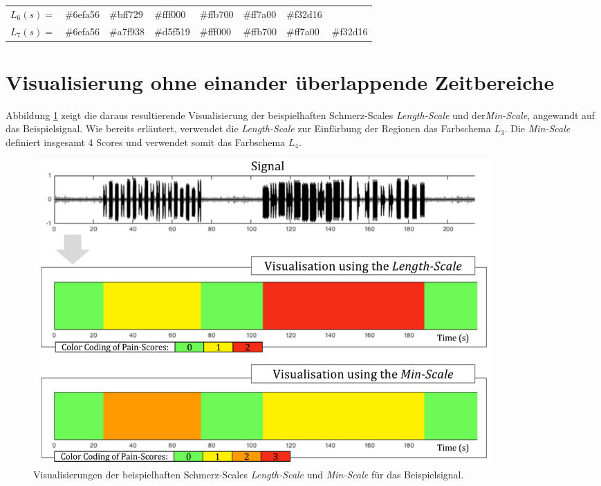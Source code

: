 \begin{table}[h]
\begin{tabular}{@{}clllllll@{}}
\multicolumn{1}{l|}{$L_6(s) = $} & \multicolumn{1}{l|}{\cellcolor[HTML]{6EFA56}\#6efa56} & \multicolumn{1}{l|}{\cellcolor[HTML]{BFF729}\#bff729} & \multicolumn{1}{l|}{\cellcolor[HTML]{FFF000}\#fff000} & \multicolumn{1}{l|}{\cellcolor[HTML]{FFB700}\#ffb700} & \multicolumn{1}{l|}{\cellcolor[HTML]{FF7A00}\#ff7a00} & \multicolumn{1}{l|}{\cellcolor[HTML]{F32D16}\#f32d16} &                                                       \\ \cmidrule(l){2-8} 
\multicolumn{1}{l|}{$L_7(s) = $} & \multicolumn{1}{l|}{\cellcolor[HTML]{6EFA56}\#6efa56} & \multicolumn{1}{l|}{\cellcolor[HTML]{A7F938}\#a7f938} & \multicolumn{1}{l|}{\cellcolor[HTML]{D5F519}\#d5f519} & \multicolumn{1}{l|}{\cellcolor[HTML]{FFF000}\#fff000} & \multicolumn{1}{l|}{\cellcolor[HTML]{FFB700}\#ffb700} & \multicolumn{1}{l|}{\cellcolor[HTML]{FF7A00}\#ff7a00} & \multicolumn{1}{l|}{\cellcolor[HTML]{F32D16}\#f32d16} \\ \bottomrule
\end{tabular}
\end{table}

\section{Visualisierung ohne einander überlappende Zeitbereiche}
\label{sec:vizNoOverlap}

Abbildung \ref{fig:viz_without_t_01} zeigt die daraus resultierende Visualisierung der beispielhaften Schmerz-Scales \emph{Length-Scale} und der\emph{Min-Scale}, angewandt auf das Beispielsignal. Wie bereits erläutert, verwendet die \emph{Length-Scale} zur Einfärbung der Regionen das Farbschema $L_3$. Die \emph{Min-Scale} definiert insgesamt 4 Scores und verwendet somit das Farbschema $L_4$.

\begin{figure}[h]
	\centering
	\includegraphics[width=0.85\textwidth]{bilder/viz_without_t_06.png}
	\caption[Visualisierungen der beispielhaften Schmerz-Scales durch schematische Balken]{Visualisierungen der beispielhaften Schmerz-Scales \emph{Length-Scale} und \emph{Min-Scale} für das Beispielsignal.}
	\label{fig:viz_without_t_01}
\end{figure}

